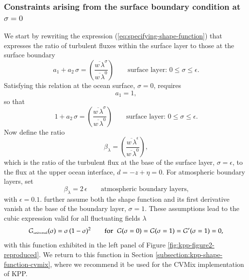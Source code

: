 \subsubsection{Constraints arising from the surface boundary condition
at $\sigma=0$}

We start by rewriting the expression
(\ref{eq:specifying-shape-function}) that expresses the ratio of
turbulent fluxes within the surface layer to those at the surface
boundary 
\begin{equation}
  a_{1} + a_{2} \, \sigma = \left( \frac{ \overline{w \, \lambda}^{\sigma}}{\overline{w \, \lambda}^{0}} \right)
 \qquad  \mbox{surface layer: $0 \le \sigma \le \epsilon$.}
\label{eq:specifying-shape-function-again}
\end{equation}
Satisfying this relation at the ocean surface, $\sigma=0$, requires
\begin{equation}
 a_{1} = 1, 
\end{equation}
 so that 
\begin{equation}
  1 + a_{2} \, \sigma = \left( \frac{ \overline{w \, \lambda}^{\sigma}}{\overline{w \, \lambda}^{0}} \right)
 \qquad  \mbox{surface layer: $0 \le \sigma \le \epsilon$.}
\label{eq:specifying-shape-function-againB}
\end{equation}
Now define the ratio
\begin{equation}
  \beta_{\lambda} = \left( \frac{ \overline{w \, \lambda}^{\epsilon}}{\overline{w \, \lambda}^{0}} \right),
\label{eq:beta-lambda-defined}
\end{equation}
which is the ratio of the turbulent flux at the base of the surface
layer, $\sigma = \epsilon$, to the flux at the upper ocean interface,
$d = -z + \eta = 0$.  For atmospheric boundary layers,
\cite{Troen_Mahrt1986} set
\begin{equation}
 \beta_{\lambda}  = 2 \, \epsilon \qquad \mbox{atmospheric boundary layers,} 
\end{equation}
with $\epsilon=0.1$.  \cite{Troen_Mahrt1986} further assume both the
shape function and its first derivative vanish at the base of the
boundary layer, $\sigma=1$.  These assumptions lead to the cubic
expression valid for all fluctuating fields $\lambda$
\begin{equation}
 G_{\mbox{\tiny universal}}(\sigma) = \sigma \, (1-\sigma)^{2}   \qquad \mbox{for} \; \; G(\sigma=0) = G(\sigma=1) = G'(\sigma=1) = 0, 
\label{eq:simple-shape-function}
\end{equation}
with this function exhibited in the left panel of Figure
\ref{fig:kpp-figure2-reproduced}.  We return to this function in
Section \ref{subsection:kpp-shape-function-cvmix}, where we recommend
it be used for the CVMix implementation of KPP.  


